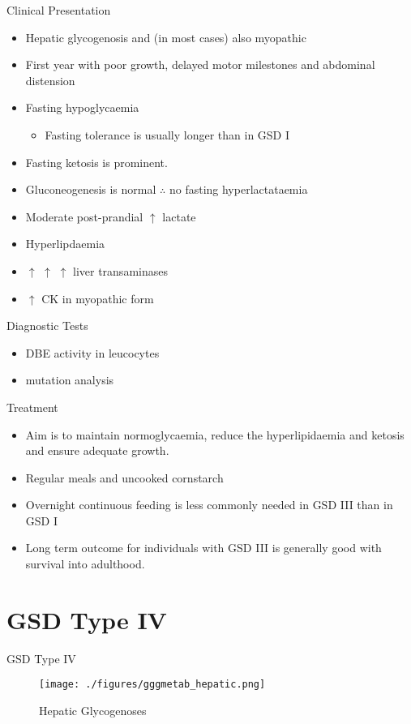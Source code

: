 \documentclass[presentation, smaller]{beamer}
\begin{document}
\begin{frame}[label={sec:orgfe58275}]{Clinical Presentation}
\begin{itemize}
\item Hepatic glycogenosis and (in most cases) also myopathic
\item First year with poor growth, delayed motor milestones and abdominal
distension
\item Fasting hypoglycaemia 
\begin{itemize}
\item Fasting tolerance is usually longer than in GSD I
\end{itemize}
\item Fasting ketosis is prominent.
\item Gluconeogenesis is normal \(\therefore\) no fasting hyperlactataemia
\item Moderate post-prandial \(\uparrow\) lactate
\item Hyperlipdaemia
\item \(\uparrow\) \(\uparrow\) \(\uparrow\) liver transaminases
\item \(\uparrow\) CK in myopathic form
\end{itemize}
\end{frame}
\begin{frame}[label={sec:orgf6f41e5}]{Diagnostic Tests}
\begin{itemize}
\item DBE activity in leucocytes
\item mutation analysis
\end{itemize}
\end{frame}
\begin{frame}[label={sec:org338dd0d}]{Treatment}
\begin{itemize}
\item Aim is to maintain normoglycaemia, reduce the hyperlipidaemia and ketosis and
ensure adequate growth.
\item Regular meals and uncooked cornstarch
\item Overnight continuous feeding is less commonly needed in GSD III than
in GSD I
\item Long term outcome for individuals with GSD III is generally good
with survival into adulthood.
\end{itemize}
\end{frame}
\section{GSD Type IV}
\label{sec:org70cc1d2}
\begin{frame}[label={sec:org4f88420}]{GSD Type IV}
\begin{figure}[htbp]
\centering
\texttt{[image: ./figures/gggmetab\_hepatic.png]}
\caption[Hepatic Glycogenoses]{\label{fig:orgc9a4b11}
Hepatic Glycogenoses}
\end{figure}
\end{frame}
\end{document}
